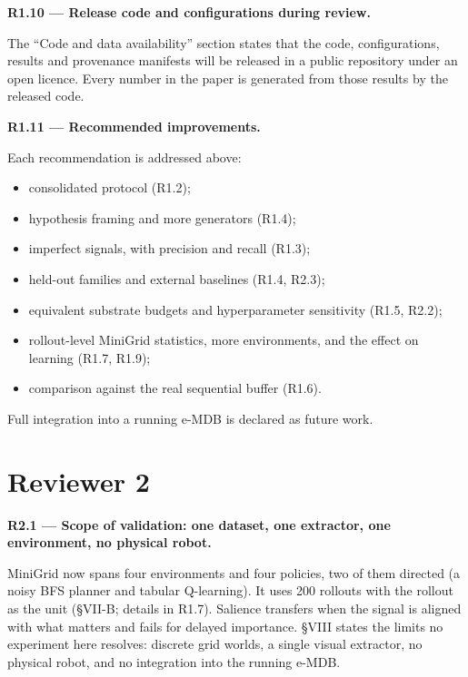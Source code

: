 \documentclass[11pt]{article}
\newcommand{\comment}[1]{\par\medskip\noindent\textbf{#1}\par}
\begin{document}
\comment{R1.10 --- Release code and configurations during review.}
The ``Code and data availability'' section states that the code,
configurations, results and provenance manifests will be released in a public
repository under an open licence. Every number in the paper is generated from
those results by the released code.

\comment{R1.11 --- Recommended improvements.}
Each recommendation is addressed above:
\begin{itemize}
\item consolidated protocol (R1.2);
\item hypothesis framing and more generators (R1.4);
\item imperfect signals, with precision and recall (R1.3);
\item held-out families and external baselines (R1.4, R2.3);
\item equivalent substrate budgets and hyperparameter sensitivity (R1.5, R2.2);
\item rollout-level MiniGrid statistics, more environments, and the effect on learning (R1.7, R1.9);
\item comparison against the real sequential buffer (R1.6).
\end{itemize}
Full integration into a running e-MDB is declared as future work.

\section*{Reviewer 2}

\comment{R2.1 --- Scope of validation: one dataset, one extractor, one environment, no physical robot.}
MiniGrid now spans four environments and four policies, two of them directed
(a noisy BFS planner and tabular Q-learning). It uses 200 rollouts with the
rollout as the unit (§VII-B; details in R1.7). Salience transfers when the
signal is aligned with what matters and fails for delayed importance. §VIII
states the limits no experiment here resolves: discrete grid worlds, a single
visual extractor, no physical robot, and no integration into the running
e-MDB.
\end{document}
